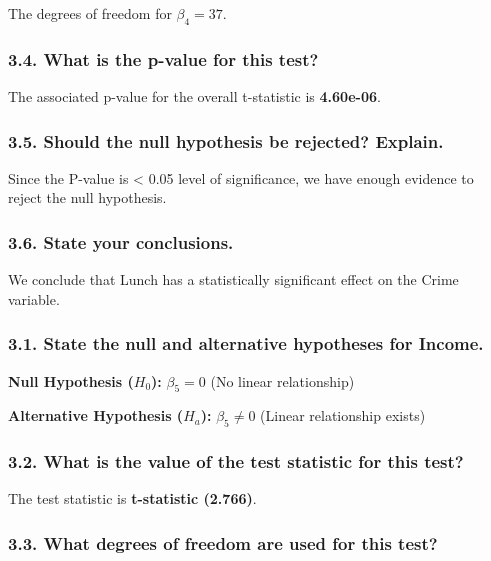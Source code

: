 \documentclass[
]{article}
\begin{document}
The degrees of freedom for \(\beta_4 = 37\).

\subsubsection{3.4. What is the p-value for this
test?}\label{what-is-the-p-value-for-this-test-4}

The associated p-value for the overall t-statistic is \textbf{4.60e-06}.

\subsubsection{3.5. Should the null hypothesis be rejected?
Explain.}\label{should-the-null-hypothesis-be-rejected-explain.-4}

Since the P-value is \textless{} 0.05 level of significance, we have
enough evidence to reject the null hypothesis.

\subsubsection{3.6. State your
conclusions.}\label{state-your-conclusions.-4}

We conclude that Lunch has a statistically significant effect on the
Crime variable.

\subsubsection{3.1. State the null and alternative hypotheses for
Income.}\label{state-the-null-and-alternative-hypotheses-for-income.}

\textbf{Null Hypothesis (\(H_0\)):} \(\beta_5 = 0\) (No linear
relationship)

\textbf{Alternative Hypothesis (\(H_a\)):} \(\beta_5 \neq 0\) (Linear
relationship exists)

\subsubsection{3.2. What is the value of the test statistic for this
test?}\label{what-is-the-value-of-the-test-statistic-for-this-test-5}

The test statistic is \textbf{t-statistic (2.766)}.

\subsubsection{3.3. What degrees of freedom are used for this
test?}\label{what-degrees-of-freedom-are-used-for-this-test-5}
\end{document}
